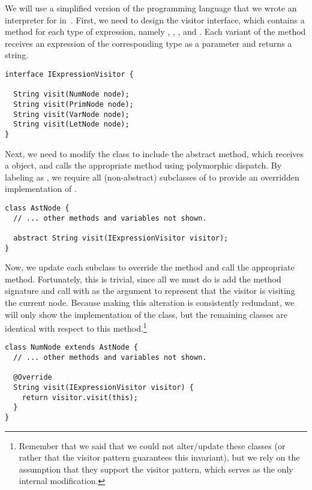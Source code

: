We will use a simplified version of the programming language that we wrote an interpreter for in~. 
First, we need to design the visitor interface, which contains a  method for each type of expression, namely , , , and . 
Each variant of the  method receives an expression of the corresponding type as a parameter and returns a string.

\enlargethispage{-2\baselineskip}
\begin{lstlisting}[language=MyJava]
interface IExpressionVisitor {
  
  String visit(NumNode node);
  String visit(PrimNode node);
  String visit(VarNode node);
  String visit(LetNode node);
}
\end{lstlisting}

Next, we need to modify the  class to include the abstract  method, which receives a  object, and calls the appropriate  method using polymorphic dispatch. 
By labeling  as , we require all (non-abstract) subclasses of  to provide an overridden implementation of .

\begin{lstlisting}[language=MyJava]
class AstNode {
  // ... other methods and variables not shown.

  abstract String visit(IExpressionVisitor visitor);
}
\end{lstlisting}

Now, we update each subclass to override the  method and call the appropriate  method. 
Fortunately, this is trivial, since all we must do is add the method signature and call  with  as the argument to represent that the visitor is visiting the current node. 
Because making this alteration is consistently redundant, we will only show the implementation of the  class, but the remaining classes are identical with respect to this method.\footnote{Remember that we said that we could not alter/update these classes (or rather that the visitor pattern guarantees this invariant), but we rely on the assumption that they support the visitor pattern, which serves as the only internal modification.}

\begin{lstlisting}[language=MyJava]
class NumNode extends AstNode {
  // ... other methods and variables not shown.

  @Override
  String visit(IExpressionVisitor visitor) {
    return visitor.visit(this);
  }
}
\end{lstlisting}

